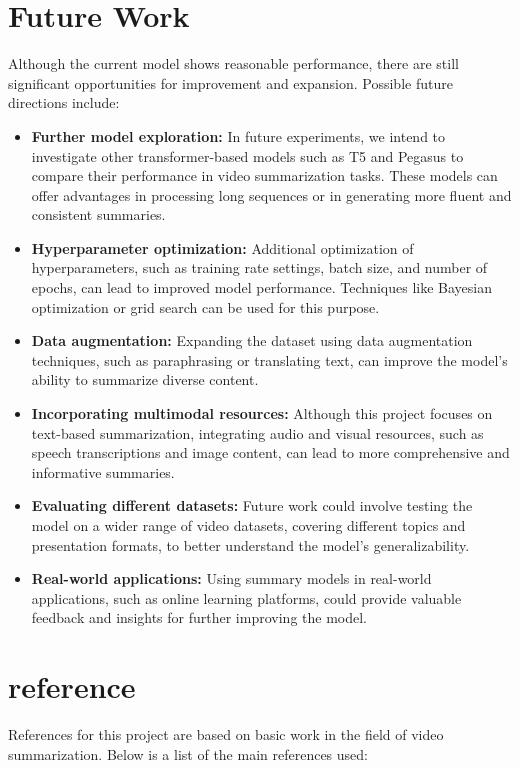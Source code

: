 \documentclass[conference]{IEEEtran}
\begin{document}
\section{Future Work}
Although the current model shows reasonable performance, there are still significant opportunities for improvement and expansion. Possible future directions include:

\begin{itemize}
    \item \textbf{Further model exploration:} In future experiments, we intend to investigate other transformer-based models such as T5 and Pegasus to compare their performance in video summarization tasks. These models can offer advantages in processing long sequences or in generating more fluent and consistent summaries.
    \item \textbf{Hyperparameter optimization:} Additional optimization of hyperparameters, such as training rate settings, batch size, and number of epochs, can lead to improved model performance. Techniques like Bayesian optimization or grid search can be used for this purpose.
    \item \textbf{Data augmentation:} Expanding the dataset using data augmentation techniques, such as paraphrasing or translating text, can improve the model’s ability to summarize diverse content.
    \item \textbf{Incorporating multimodal resources:} Although this project focuses on text-based summarization, integrating audio and visual resources, such as speech transcriptions and image content, can lead to more comprehensive and informative summaries.
    \item \textbf{Evaluating different datasets:} Future work could involve testing the model on a wider range of video datasets, covering different topics and presentation formats, to better understand the model's generalizability.
    \item \textbf{Real-world applications:} Using summary models in real-world applications, such as online learning platforms, could provide valuable feedback and insights for further improving the model.
\end{itemize}



\section{reference}

References for this project are based on basic work in the field of video summarization. Below is a list of the main references used:
\end{document}
